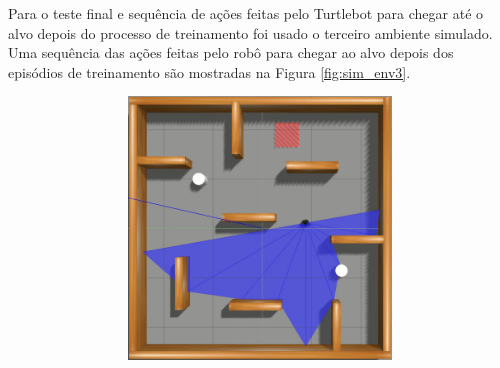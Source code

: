 Para o teste final e sequência de ações feitas pelo Turtlebot para chegar até o alvo depois do processo de treinamento foi usado o terceiro ambiente simulado.
Uma sequência das ações feitas pelo robô para chegar ao alvo depois dos episódios de treinamento são mostradas na Figura \ref{fig:sim_env3}.

\vspace{0.25cm}
\begin{figure}[H]
\caption{Imagens sequência no terceiro ambiente simulado do experimento}
    \begin{center}
    \begin{subfigure}[b]{0.60\textwidth}
        \begin{subfigure}[b]{0.24\textwidth}
            \includegraphics[width=\textwidth]{imagens/simulated_envs/sim_env3_ddpg/1.png}
        \end{subfigure}
        \hfill
        \begin{subfigure}[b]{0.24\textwidth}

\end{subfigure}
\end{subfigure}
\end{center}
\end{figure}
